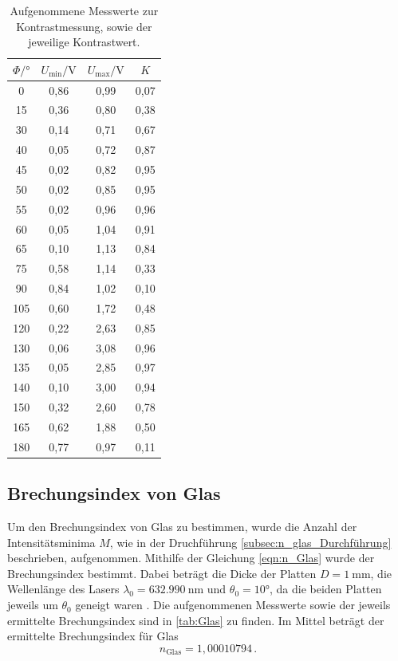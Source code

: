 \begin{table}[H]
  \centering
  \caption{Aufgenommene Messwerte zur Kontrastmessung, sowie der jeweilige Kontrastwert.}
  \label{tab:Kontrast}
  \begin{tabular}{c c c c}
    \toprule
    $\Phi / \si{\degree} $ & $U_{\text{min}} / \si{\volt}$ & $U_{\text{max}} / \si{\volt}$ & $K$ \\
    \midrule
    0     &  0,86  &  0,99  & 0,07  \\
    15    &  0,36  &  0,80  & 0,38  \\
    30    &  0,14  &  0,71  & 0,67  \\
    40    &  0,05  &  0,72  & 0,87  \\
    45    &  0,02  &  0,82  & 0,95  \\
    50    &  0,02  &  0,85  & 0,95  \\
    55    &  0,02  &  0,96  & 0,96  \\
    60    &  0,05  &  1,04  & 0,91  \\
    65    &  0,10  &  1,13  & 0,84  \\
    75    &  0,58  &  1,14  & 0,33  \\
    90    &  0,84  &  1,02  & 0,10  \\
    105   &  0,60  &  1,72  & 0,48  \\
    120   &  0,22  &  2,63  & 0,85  \\
    130   &  0,06  &  3,08  & 0,96  \\
    135   &  0,05  &  2,85  & 0,97  \\
    140   &  0,10  &  3,00  & 0,94  \\
    150   &  0,32  &  2,60  & 0,78  \\
    165   &  0,62  &  1,88  & 0,50  \\
    180   &  0,77  &  0,97  & 0,11  \\
    \bottomrule
  \end{tabular}
\end{table}

\subsection{Brechungsindex von Glas}
\label{subsec:n_Glas}
Um den Brechungsindex von Glas zu bestimmen, wurde die Anzahl der Intensitätsminima $M$, wie in der Druchführung \ref{subsec:n_glas_Durchführung} beschrieben, aufgenommen.
Mithilfe der Gleichung \eqref{eqn:n_Glas} wurde der Brechungsindex bestimmt.
Dabei beträgt die Dicke der Platten $D = \SI{1}{\milli\metre}$, die Wellenlänge des Lasers $\lambda_0 = \SI{632.990}{\nano\metre}$ und $\theta_0 = 10°$, da die beiden Platten jeweils um $\theta_0$ geneigt waren \cite{anleitung}.
Die aufgenommenen Messwerte sowie der jeweils ermittelte Brechungsindex sind in \autoref{tab:Glas} zu finden.
Im Mittel beträgt der ermittelte Brechungsindex für Glas 
\begin{equation*}
    n_\text{Glas} = 1,00010794 \,.
\end{equation*}

